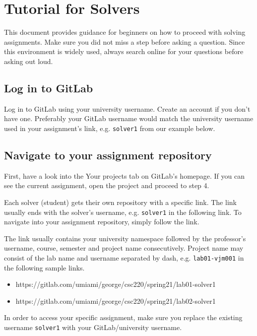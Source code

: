 \chapter{Tutorial for Solvers} \label{apx:tut-sol}

{This document provides guidance for beginners on how to proceed with solving assignments. Make sure you did not miss a step before asking a question. Since this environment is widely used, always search online for your questions before asking out loud.}

\section{Log in to GitLab}\label{sec:login}

{Log in to GitLab using your university username. Create an account if you don't have one. Preferably your GitLab username would match the university username used in your assignment's link, e.g. \texttt{solver1} from our example below.}

\section{Navigate to your assignment repository}\label{sec:navig}

{First, have a look into the Your projects tab on GitLab's homepage. If you can see the current assignment, open the project and proceed to step 4.}

{Each solver (student) gets their own repository with a specific link. The link usually ends with the solver's username, e.g. \texttt{solver1} in the following link. To navigate into your assignment repository, simply follow the link.}

{The link usually contains your university namespace followed by the professor's username, course, semester and project name consecutively. Project name may consist of the lab name and username separated by dash, e.g. \texttt{lab01-vjm001} in the following sample links.}

\begin{itemize}
\item
  {https://gitlab.com/umiami/george/csc220/spring21/lab01-solver1}
\item
  {https://gitlab.com/umiami/george/csc220/spring21/lab02-solver1}
\end{itemize}

{In order to access your specific assignment, make sure you replace the existing username \texttt{solver1} with your GitLab/university username.}

